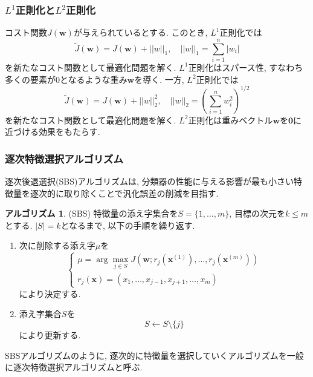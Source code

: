 \documentclass[uplatex]{jsarticle}
\theoremstyle{definition}
\newtheorem{algorithm}[definition]{アルゴリズム}
\numberwithin{equation}{section}
\newcommand{\norm}[1]{\left|\left|#1\right|\right|}
\begin{document}
\subsubsection{$L^{1}$正則化と$L^{2}$正則化}
コスト関数$J(\bm{w})$が与えられているとする.
このとき, $L^{1}$正則化では
\begin{equation}
    \tilde{J}(\bm{w}) = J(\bm{w}) + \norm{w}_{1}, \quad \norm{w}_{1} = \sum_{i = 1}^{n} |w_{i}|
\end{equation}
を新たなコスト関数として最適化問題を解く.
$L^{1}$正則化はスパース性, すなわち多くの要素が$0$となるような重み$\bm{w}$を導く.
一方, $L^{2}$正則化では
\begin{equation}
    \tilde{J}(\bm{w}) = J(\bm{w}) + \norm{w}_{2}^{2}, \quad \norm{w}_{2} = \left(\sum_{i = 1}^{n} w_{i}^{2}\right)^{1/2}
\end{equation}
を新たなコスト関数として最適化問題を解く.
$L^{2}$正則化は重みベクトル$\bm{w}$を$\bm{0}$に近づける効果をもたらす.

\subsubsection{逐次特徴選択アルゴリズム}
逐次後退選択(SBS)アルゴリズムは, 分類器の性能に与える影響が最も小さい特徴量を逐次的に取り除くことで汎化誤差の削減を目指す.
\begin{algorithm}
    (SBS)
    特徴量の添え字集合を$S = \{1, \dots, m\}$, 目標の次元を$k \leq m$とする.
    $|S| = k$となるまで, 以下の手順を繰り返す.
    \begin{enumerate}
        \item
        次に削除する添え字$\mu$を
        \begin{equation}
            \left\{
                \begin{aligned}
                    \mu = \arg\max_{j \in S} J(\bm{w}; r_{j}(\bm{x}^{(1)}), \dots, r_{j}(\bm{x}^{(m)})) \\
                    r_{j}(\bm{x}) = (x_{1}, \dots, x_{j - 1}, x_{j + 1}, \dots, x_{m})
                \end{aligned}
            \right.
        \end{equation}
        により決定する.
        \item
        添え字集合$S$を
        \begin{equation}
            S \leftarrow S \setminus \{j\}
        \end{equation}
        により更新する.
    \end{enumerate}
\end{algorithm}

SBSアルゴリズムのように, 逐次的に特徴量を選択していくアルゴリズムを一般に逐次特徴選択アルゴリズムと呼ぶ.
\end{document}

